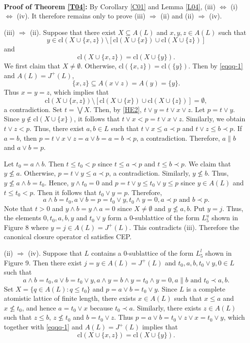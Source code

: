 \documentclass[12pt]{article}
\begin{document}
\quad\\
\textbf{Proof of Theorem \ref{T04}:} By Corollary \ref{C01} and Lemma \ref{L04}, (iii) $\Longleftrightarrow$ (i) $\Longleftrightarrow$ (iv). It therefore remains only to prove (iii) $\Longrightarrow$ (ii) and (ii) $\Longrightarrow$ (iv).

(iii) $\Longrightarrow$ (ii). Suppose that there exist $X\subseteq A(L)$ and $x, y, z\in A(L)$ such that
\begin{equation}\label{HE1}
y\in \mbox{cl}(X\cup\{x,z\}) \setminus [\mbox{cl}(X\cup\{x\})\cup \mbox{cl}(X\cup \{z\})]    
\end{equation} 
and 
\begin{equation}\label{HE2}
\mbox{cl}(X\cup\{x,z\})=\mbox{cl}(X\cup\{y\}).
\end{equation}
We first claim that $X\neq \emptyset$. Otherwise, $\mbox{cl}(\{x,z\})=\mbox{cl}(\{y\})$. Then by \eqref{eqqq-1} and 
$A(L)=J^{+}(L)$, $$\{x,z\}\subseteq A(x\vee z)=A(y)=\{y\}.$$
Thus $x=y=z$, which implies that $$\mbox{cl}(X\cup\{x,z\}) \setminus [\mbox{cl}(X\cup\{x\})\cup \mbox{cl}(X\cup \{z\})]=\emptyset,$$ a contradiction.
Set $t=\bigvee X$. Then, by \eqref{HE2}, $t\vee y=t\vee x\vee z$. Let $p=t\vee y$. Since $y\notin \mbox{cl}(X\cup\{x\})$, it follows that $t\vee x<p=t\vee x\vee z$. Similarly, we obtain $t\vee z<p$. Thus, there exist $a, b\in L$ such that $t\vee x\leq a\prec p$ and $t\vee z\leq b\prec p$. If $a=b$, then $p=t\vee x\vee z=a\vee b=a=b\prec p$, a contradiction. Therefore, $a\parallel b$ and $a\vee b=p$.

Let $t_0=a\wedge b$. Then $t\leq t_0< p$ since $t\leq a\prec p$ and $t\leq b\prec p$. We claim that $y\nleq a$. Otherwise, $p=t\vee y\leq a\prec p$, a contradiction. Similarly, $y\nleq b$. Thus, $y\nleq a\wedge b=t_0$. Hence, $y\wedge t_0=0$ and $p=t\vee y\leq t_0\vee y\leq p$ since $y\in A(L)$ and $t\leq t_0<p$. Then it follows that $t_0\vee y=p$. 
Therefore, $$a\wedge b=t_0, a\vee b=p=t_0\vee y, t_0\wedge y=0, a\prec p \mbox{ and } b\prec p.$$ 
Note that $t>0$ and $y\wedge b=y\wedge a=0$ since $X\neq \emptyset$ and $y\nleq a, b$. Put $y=j$. Thus, the elements $0, t_0, a, b, y$ and $t_0\vee y$ form a $0$-sublattice of the form $L_{5}^{u}$ shown in Figure 8 where $y=j\in A(L)=J^{+}(L)$. This contradicts (iii). Therefore the canonical closure operator $\mbox{cl}$ satisfies CEP.

(ii) $\Longrightarrow$ (iv). Suppose that $L$ contains a $0$-sublattice of the form $L_{5}^{l}$ shown in Figure 9. Then there exist $j=y\in A(L)=J^{+}(L)$ and $t_0, a, b, t_0\vee y, 0\in L$ such that $$a\wedge b=t_0, a\vee b=t_0\vee y, a\wedge y=b\wedge y=t_0\wedge y=0, a\parallel b \mbox{ and } t_0\prec a, b.$$
Set $X=\{q\in A(L): q\leq t_0\}$ and $p=a\vee b=t_0\vee y$. 
Since $L$ is a complete atomistic lattice of finite length, there exists $x\in A(L)$ such that $x\leq a$ and $x\nleq t_0$, and hence $a=t_0\vee x$ because $t_0\prec a$. Similarly, there exists $z\in A(L)$ such that $z\leq b$, $z\nleq t_0$ and $b=t_0\vee z$. Thus $p=a\vee b=t_0\vee z\vee x=t_0\vee y$, 
which together with \eqref{eqqq-1} and $A(L)=J^{+}(L)$ implies that $$\mbox{cl}(X\cup\{x,z\})=\mbox{cl}(X\cup\{y\}).$$
\end{document}
